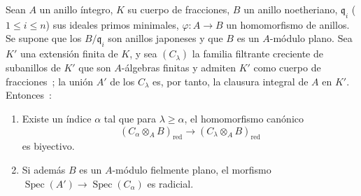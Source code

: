 \begin{proposition}[23.2.4]
\label{0.23.2.4-es}
Sean $A$ un anillo íntegro, $K$ su cuerpo de fracciones, $B$ un anillo
noetheriano, $\mathfrak q_i$ ($1\leqslant i\leqslant n$) sus ideales primos
minimales, $\varphi:A\to B$ un homomorfismo de anillos. Se supone que los
$B/\mathfrak q_i$ son anillos japoneses y que $B$ es un $A$-módulo
plano. Sea $K'$ una extensión finita de $K$, y sea $(C_\lambda)$ la familia
filtrante creciente de subanillos de $K'$ que son $A$-álgebras
finitas y admiten $K'$ como cuerpo de fracciones~; la unión $A'$ de los
$C_\lambda$ es, por tanto, la clausura integral de $A$ en $K'$. Entonces~:
\begin{enumerate}
  \item[\textup{(i)}] Existe un índice $\alpha$ tal que para $\lambda\geqslant
  \alpha$, el homomorfismo canónico
  \begin{equation}
  \label{0.23.2.4.1-es}
    (C_\alpha\otimes_AB)_{\mathrm{red}}
    \longrightarrow(C_\lambda\otimes_AB)_{\mathrm{red}}
    \tag{23.2.4.1}
  \end{equation}
  es biyectivo.
  \item[\textup{(ii)}] Si además $B$ es un $A$-módulo fielmente plano, el morfismo
  $\operatorname{Spec}(A')\to\operatorname{Spec}(C_\alpha)$ es radicial.
\end{enumerate}
\end{proposition}

